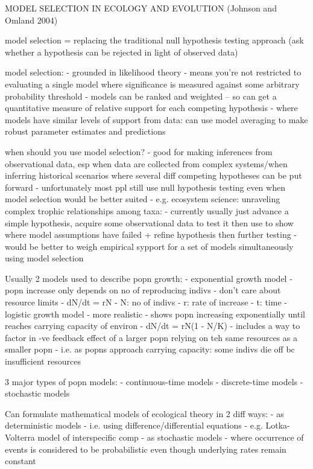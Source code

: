 \documentclass[11pt]{article}
\begin{document}
	
	
	MODEL SELECTION IN ECOLOGY AND EVOLUTION (Johnson and Omland 2004)
	
	model selection = replacing the traditional null hypothesis testing approach (ask whether a hypothesis can be rejected in light of observed data)
	
	model selection:
	- grounded in likelihood theory
	- means you're not restricted to evaluating a single model where significance is measured against some arbitrary probability threshold
	- models can be ranked and weighted -- so can get a quantitative measure of relative support for each competing hypothesis
	- where models have similar levels of support from data: can use model averaging to make robust parameter estimates and predictions
	
	when should you use model selection?
	- good for making inferences from observational data, esp when data are collected from complex systems/when inferring historical scenarios where several diff competing hypotheses can be put forward
	- unfortunately most ppl still use null hypothesis testing even when model selection would be better suited
	- e.g. ecosystem science: unraveling complex trophic relationships among taxa:
	- currently usually just advance a simple hypothesis, acquire some observational data to test it then use to show where model assumptions have failed + refine hypothesis then further testing
	- would be better to weigh empirical sypport for a set of models simultaneously using model selection
	
	
	Usually 2 models used to describe popn growth:
	- exponential growth model
	- popn increase only depends on no of reproducing indivs 
	- don't care about resource limits
	- dN/dt = rN
	- N: no of indivs
	- r: rate of increase
	- t: time
	- logistic growth model
	- more realistic
	- shows popn increasing exponentially until reaches carrying capacity of environ
	- dN/dt = rN(1 - N/K)
	- includes a way to factor in -ve feedback effect of a larger popn relying on teh same resources as a smaller popn     - i.e. as popns approach carrying capacity: some indivs       die off bc insufficient resources
	
	3 major types of popn models:
	- continuous-time models
	- discrete-time models
	- stochastic models
	
	Can formulate mathematical models of ecological theory in 2 diff ways:
	- as deterministic models
	- i.e. using difference/differential equations
	- e.g. Lotka-Volterra model of interspecific comp
	- as stochastic models
	- where occurrence of events is considered to be probabilistic even though underlying rates remain constant
	
\end{document}
